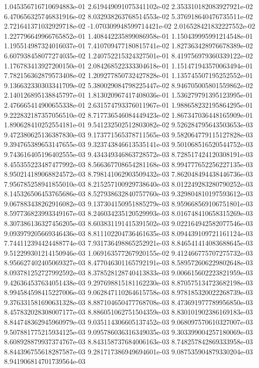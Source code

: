 1.045356716710694883e-01
2.619449091075341102e-02
2.353310182083927921e-02
6.470656325746831916e-02
8.032938263768514553e-02
5.376918640476735511e-02
2.721641371032929718e-02
-1.070309948599714421e-02
2.016528421832227552e-02
1.227796649966765852e-01
1.408442235899086958e-01
1.150439995991214548e-01
1.195514987324016037e-01
7.410709477180815741e-02
1.827363428976678389e-02
6.607938458077274035e-02
1.240752215324327501e-01
8.419756979360339122e-02
1.176783413927200150e-01
2.084268522333304618e-01
1.151471943570063494e-01
7.782156362879573408e-02
1.209277850732427828e-01
1.135745507195252552e-01
9.136632330303341709e-02
5.380029084798225447e-02
8.946705005801559862e-02
2.140126895138845797e-01
1.813020967417408036e-01
1.536279791395123995e-01
2.476665414900655338e-01
2.631574793376011967e-01
1.988658232195864295e-01
9.222832187357056510e-02
8.717736546084449423e-02
1.867347036448165909e-01
1.890628410252554181e-01
9.541232502512803082e-02
9.526284795643503653e-03
9.472380625136387830e-03
9.173771565378711565e-03
9.582064779115127828e-03
9.394765389653147655e-03
9.323743846613535141e-03
9.501068516520544752e-03
9.743616405196402555e-03
9.434349346863728572e-03
8.728517424120308191e-03
8.455355223487477992e-03
8.566367708654281168e-03
8.994777652256227135e-03
8.950214189068824572e-03
8.798141062903509432e-03
7.862048494438446736e-03
7.956785258941855010e-03
8.215257100929738640e-03
8.012249283280790252e-03
8.145326506453765686e-03
8.527938632840757760e-03
9.329804810197593612e-03
9.067883438262916082e-03
9.137304150951885279e-03
8.959668569106751801e-03
8.597736823993349167e-03
8.246034235120529993e-03
8.016748410658315269e-03
8.307386136327456205e-03
8.603831191415391502e-03
9.022164942582077546e-03
9.093979205669346436e-03
8.811102204736461635e-03
8.094439109721161124e-03
7.744112394424488774e-03
7.931736498865252921e-03
8.846541414083688645e-03
9.512299301214150946e-03
1.069163577267920155e-02
9.412466775707275732e-03
8.956627402405069327e-03
8.477046301165792191e-03
8.589572606229802648e-03
8.093781252727992592e-03
8.378528128740413833e-03
9.006615602223821959e-03
9.426364537634051438e-03
9.297698815181162230e-03
8.870575134723682198e-03
8.994584598415227006e-03
9.062847110264615758e-03
8.978185320022268739e-03
9.376331581690631328e-03
8.887104650477768708e-03
8.473691977789956850e-03
8.457832028308007177e-03
8.886051062751504359e-03
8.830101902386169183e-03
8.844748362945960979e-03
9.035114306605137452e-03
9.068097570610327007e-03
9.507881775215934125e-03
9.095786036316349035e-03
9.303399004257180069e-03
8.608928879937374767e-03
8.843158737684006163e-03
8.748257842869333958e-03
8.844396755618287587e-03
9.281717386949694601e-03
9.087535904879330204e-03
8.941906814701739564e-03
